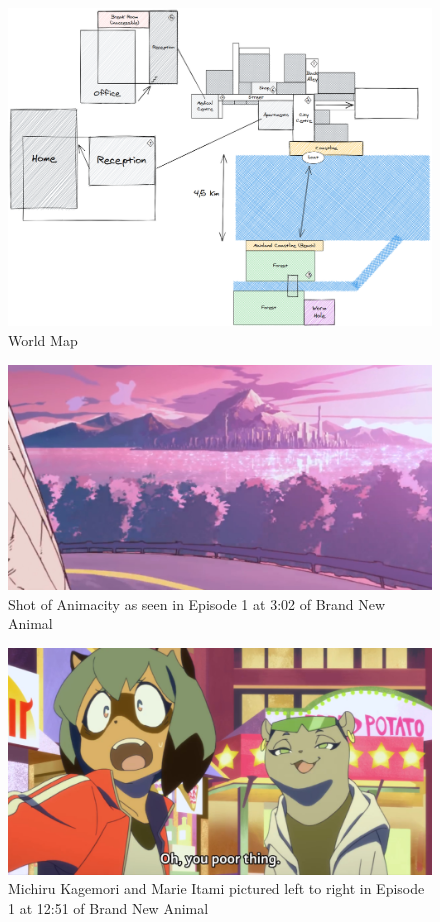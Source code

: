 \documentclass{article}
\begin{document}
    \captionsetup{justification=centering,margin=3cm}
    \begin{figure}
        \centering
        \includegraphics[width=\textwidth]{../src/main/resources/map/base.png}
        \caption{World Map} \label{fig:map}
    \end{figure}
    \begin{figure}
        \centering
        \includegraphics[width=\textwidth]{images/runaway-raccoon-302.jpg}
        \caption{Shot of Animacity as seen in Episode 1 at 3:02 of Brand New Animal \cite{bna}} \label{fig:runaway-raccoon}
    \end{figure}
    \begin{figure}
        \centering
        \includegraphics[width=\textwidth]{images/festival-marie.jpg}
        \caption{Michiru Kagemori and Marie Itami pictured left to right in Episode 1 at 12:51 of Brand New Animal \cite{bna}} \label{fig:festival-marie}
    \end{figure}
\end{document}
